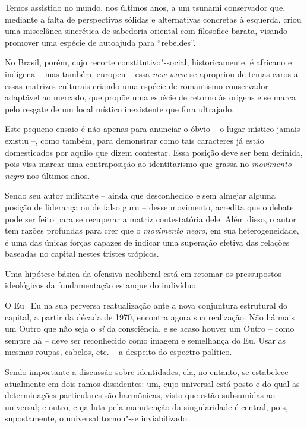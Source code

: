 Temos assistido no mundo, nos últimos anos, a um tsunami conservador
que, mediante a falta de perspectivas sólidas e alternativas concretas à
esquerda, criou uma miscelânea sincrética de sabedoria oriental com
filosofice barata, visando promover uma espécie de autoajuda para
``rebeldes''.

No Brasil, porém, cujo recorte constitutivo"-social, historicamente, é
africano e indígena -- mas também, europeu -- essa \emph{new wave} se
apropriou de temas caros a essas matrizes culturais criando uma espécie
de romantismo conservador adaptável ao mercado, que propõe uma espécie
de retorno às origens e se marca pelo resgate de um local místico
inexistente que fora ultrajado.

Este pequeno ensaio é não apenas para anunciar o óbvio -- o lugar
místico jamais existiu --, como também, para demonstrar como tais
caracteres já estão domesticados por aquilo que dizem contestar. Essa
posição deve ser bem definida, pois visa marcar uma contraposição ao
identitarismo que grassa no \emph{movimento negro} nos últimos anos.

Sendo seu autor militante -- ainda que desconhecido e sem almejar alguma
posição de liderança ou de falso guru -- desse movimento, acredita que o
debate pode ser feito para se recuperar a matriz contestatória dele.
Além disso, o autor tem razões profundas para crer que o \emph{movimento
negro}, em sua heterogeneidade, é uma das únicas forças capazes de
indicar uma superação efetiva das relações baseadas no capital nestes
tristes trópicos.

Uma hipótese básica da ofensiva neoliberal está em retomar os
pressupostos ideológicos da fundamentação estanque do indivíduo.

O Eu=Eu na sua perversa reatualização ante a nova conjuntura estrutural
do capital, a partir da década de 1970, encontra agora sua realização.
Não há mais um Outro que não seja o \emph{si} da consciência, e se acaso
houver um Outro -- como sempre há -- deve ser reconhecido como imagem e
semelhança do Eu. Usar as mesmas roupas, cabelos, etc. -- a despeito do
espectro político.

Sendo importante a discussão sobre identidades, ela, no entanto, se
estabelece atualmente em dois ramos dissidentes: um, cujo universal está
posto e do qual as determinações particulares são harmônicas, visto que
estão subsumidas ao universal; e outro, cuja luta pela manutenção da
singularidade é central, pois, supostamente, o universal tornou"-se
inviabilizado.

